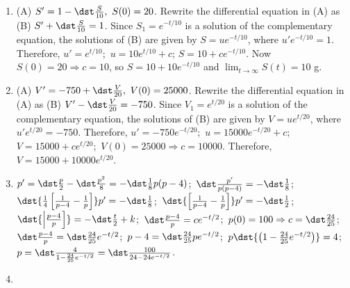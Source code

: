 \documentclass[openany]{book}
\newenvironment{sectionSolutions}{
 \begin{enumerate}[item-label={\thesection.\arabic{enumi}.}]
}{
 \end{enumerate}
}
\begin{document}
\begin{sectionSolutions}
\item
(A) $S'=1-\dst\frac{S}{10},\ S(0)=20$. Rewrite the
differential equation in (A) as (B) $S'+\dst\frac{S}{10}=1$. Since
$S_1=e^{-t/10}$ is a solution of the complementary equation, the
solutions of (B) are given by $S=ue^{-t/10}$, where $u'e^{-t/10}=1$.
Therefore, $u'=e^{t/10}$;\ $u=10e^{t/10}+c$;\;
$S=10+ce^{-t/10}$. Now $S(0)=20\Rightarrow c=10$, so
$S=10+10e^{-t/10}$ and
 $\lim_{t\to\infty}S(t)=10$ g.


\item
 (A) $V'=-750+\dst\frac{V}{20},\ V(0)=25000$. Rewrite the
differential equation in (A) as (B) $V'-\dst\frac{V}{20}=-750$. Since
$V_1=e^{t/20}$ is a solution of the complementary equation, the
solutions of (B) are given by $V=ue^{t/20}$, where $u'e^{t/20}=-750$.
Therefore, $u'=-750e^{-t/20}$;\ $u=15000e^{-t/20}+c$;\;
$V=15000+ce^{t/20}$;\ $V(0)=25000\Rightarrow c=10000$. Therefore,
$V=15000+10000e^{t/20}$.


\item
$p'=\dst\frac{p}{2}-\dst\frac{p^2}{8}=-\dst\frac{1}{8}p(p-4)$;\,
$\dst\frac{p'}{ p(p-4)}=-\dst\frac{1}{8}$;\, $\dst{\frac{1}{4}\left[
\frac{1}{ p-4}-\frac{1}{ p}\right]}p'=-\dst\frac{1}{8}$;\,
 $\dst{\left[
\frac{1}{ p-4}-\frac{1}{ p}\right]}p'=-\dst\frac{1}{2}$;\,
$\dst{\left|\frac{p-4}{ p}\right]}=-\dst\frac{t}{2}+k$;\,
$\dst\frac{p-4}{ p}=ce^{-t/2}$;\, $p(0)=100\Rightarrow
c=\dst\frac{24}{25}$;\, $\dst\frac{p-4}{ p}=\dst\frac{24}{25}e^{-t/2}$;\,
$p-4=\dst\frac{24}{25}pe^{-t/2}$;\,
$p\dst{\left(1-\frac{24}{25}e^{-t/2}\right)}=4$;\,
$p=\dst\frac{4}{1-\frac{24}{25}e^{-t/2}}=\dst\frac{100}{24-24e^{-t/2}}$.


\item
{}


\end{sectionSolutions}
\end{document}

